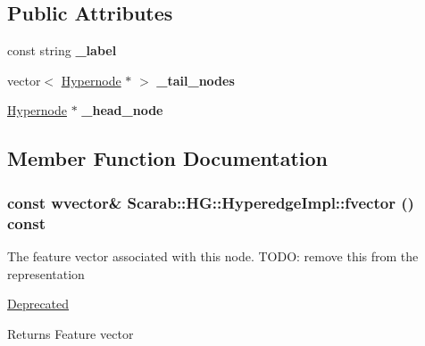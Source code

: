 \subsection*{Public Attributes}
\begin{DoxyCompactItemize}
\item 
\hypertarget{classScarab_1_1HG_1_1HyperedgeImpl_ab14180934c56806b0004bcbdac9eef88}{
const string {\bfseries \_\-label}}
\label{classScarab_1_1HG_1_1HyperedgeImpl_ab14180934c56806b0004bcbdac9eef88}

\item 
\hypertarget{classScarab_1_1HG_1_1HyperedgeImpl_a70fab435c66aab79825aab6b9058cda5}{
vector$<$ \hyperlink{classScarab_1_1HG_1_1Hypernode}{Hypernode} $\ast$ $>$ {\bfseries \_\-tail\_\-nodes}}
\label{classScarab_1_1HG_1_1HyperedgeImpl_a70fab435c66aab79825aab6b9058cda5}

\item 
\hypertarget{classScarab_1_1HG_1_1HyperedgeImpl_a92aeb9593a64be769f18666c3bfd0a20}{
\hyperlink{classScarab_1_1HG_1_1Hypernode}{Hypernode} $\ast$ {\bfseries \_\-head\_\-node}}
\label{classScarab_1_1HG_1_1HyperedgeImpl_a92aeb9593a64be769f18666c3bfd0a20}

\end{DoxyCompactItemize}


\subsection{Member Function Documentation}
\hypertarget{classScarab_1_1HG_1_1HyperedgeImpl_a359446c285164a93995bb87e6ea74882}{
\subsubsection[{fvector}]{\setlength{\rightskip}{0pt plus 5cm}const wvector\& Scarab::HG::HyperedgeImpl::fvector () const}}
\label{classScarab_1_1HG_1_1HyperedgeImpl_a359446c285164a93995bb87e6ea74882}
The feature vector associated with this node. TODO: remove this from the representation \begin{Desc}
\item[\hyperlink{deprecated__deprecated000005}{Deprecated}]\end{Desc}
\begin{DoxyReturn}{Returns}
Feature vector 
\end{DoxyReturn}


